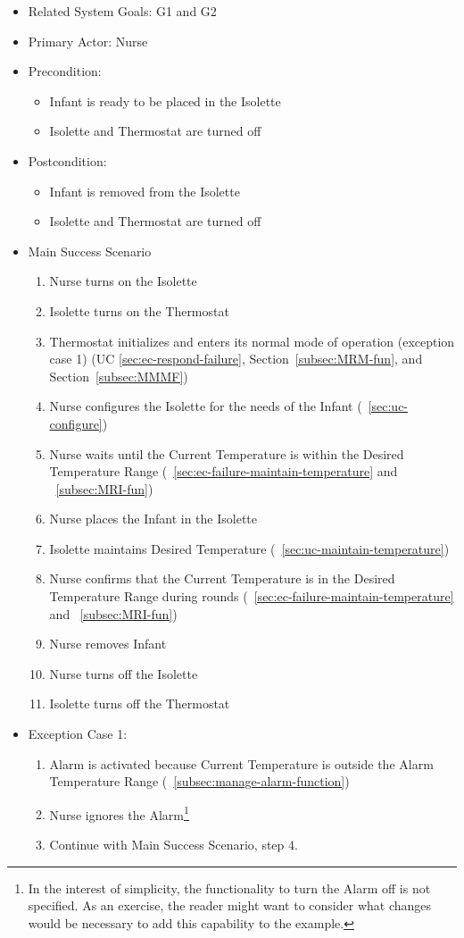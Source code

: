 \begin{itemize}
\item Related System Goals: G1 and G2
\item Primary Actor: Nurse
\item Precondition:
  \begin{itemize}
  \item Infant is ready to be placed in the Isolette
  \item Isolette and Thermostat are turned off
   \end{itemize}
\item Postcondition:
  \begin{itemize}   
  \item Infant is removed from the Isolette
  \item Isolette and Thermostat are turned off
  \end{itemize}
\item Main Success Scenario
  \begin{enumerate}
  \item Nurse turns on the Isolette
  \item Isolette turns on the Thermostat
  \item  Thermostat initializes and enters its normal mode of
    operation (exception case 1)
     (UC \ref{sec:ec-respond-failure}, Section~\ref{subsec:MRM-fun}, and Section~\ref{subsec:MMMF})
  \item Nurse configures the Isolette for the needs of the Infant (~\ref{sec:uc-configure})
  \item Nurse waits until the Current Temperature is within the Desired Temperature
            Range (~\ref{sec:ec-failure-maintain-temperature} and ~\ref{subsec:MRI-fun})
  \item Nurse places the Infant in the Isolette
  \item Isolette maintains Desired Temperature (~\ref{sec:uc-maintain-temperature})
  \item Nurse confirms that the Current Temperature is in the Desired Temperature Range during rounds (~\ref{sec:ec-failure-maintain-temperature} and ~\ref{subsec:MRI-fun})
  \item Nurse removes Infant
  \item Nurse turns off the Isolette
  \item Isolette turns off the Thermostat
  \end{enumerate}
\item Exception Case 1:
  \begin{enumerate}
  \item Alarm is activated because Current Temperature is outside the Alarm
Temperature Range (~\ref{subsec:manage-alarm-function})
  \item Nurse ignores the Alarm\footnote{In the interest of simplicity, the functionality to turn the Alarm off is not specified. As an exercise, the reader might want to consider what changes would be necessary to add this capability to the example.}
  \item Continue with Main Success Scenario, step 4.
  \end{enumerate}
\end{itemize}  


